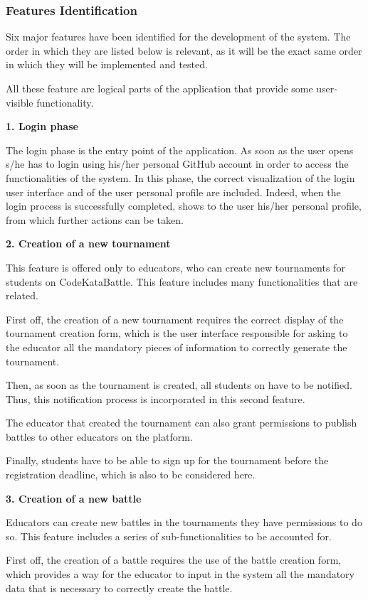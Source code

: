\subsubsection{Features Identification}
Six major features have been identified for the development of the \app system. The order in which they are listed below is relevant, as it will be the exact same order in which they will be implemented and tested.

All these feature are logical parts of the application that provide some user-visible functionality.

\textbf{1. Login phase}

The login phase is the entry point of the application. As soon as the user opens \app s/he has to login using his/her personal GitHub account in order to access the functionalities of the system.
In this phase, the correct visualization of the login user interface and of the user personal profile are included. Indeed, when the login process is successfully completed, \app shows to the user his/her personal profile, from which further actions can be taken.

\textbf{2. Creation of a new tournament}

This feature is offered only to educators, who can create new tournaments for students on CodeKataBattle. This feature includes many functionalities that are related.

First off, the creation of a new tournament requires the correct display of the tournament creation form, which is the user interface responsible for asking to the educator all the mandatory pieces of information to correctly generate the tournament. 

Then, as soon as the tournament is created, all students on \app have to be notified. Thus, this notification process is incorporated in this second feature.

The educator that created the tournament can also grant permissions to publish battles to other educators on the platform.

Finally, students have to be able to sign up for the tournament before the registration deadline, which is also to be considered here.


\textbf{3. Creation of a new battle}

Educators can create new battles in the tournaments they have permissions to do so. This feature includes a series of sub-functionalities to be accounted for.

First off, the creation of a battle requires the use of the battle creation form, which provides a way for the educator to input in the system all the mandatory data that is necessary to correctly create the battle. 

